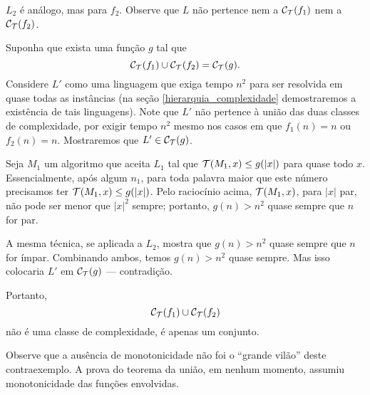 \begin{counterexample}
    $L_2$ é análogo, mas para $f_2$.
    Observe que $L$ não pertence nem a $\mathcal C_{\mathcal{T}}(f_1)$
    nem a $\mathcal C_{\mathcal{T}}(f_2)$.

    Suponha que exista uma função $g$ tal que
    \begin{equation*}
        \mathcal C_{\mathcal{T}}(f_1) \cup \mathcal C_{\mathcal{T}}(f_2) =
        \mathcal C_{\mathcal{T}}(g).
    \end{equation*}
    Considere $L'$ como uma linguagem que exiga tempo $n^2$
    para ser resolvida em quase todas as instâncias
    (na seção \ref{hierarquia_complexidade}
    demostraremos a existência de tais linguagens).
    Note que $L'$ não pertence à união das duas classes de complexidade,
    por exigir tempo $n^2$ mesmo nos casos em que
    $f_1(n) = n$ ou $f_2(n) = n$.
    Mostraremos que $L' \in \mathcal C_{\mathcal{T}}(g)$.

    Seja $M_1$ um algoritmo que aceita $L_1$
    tal que ${\mathcal{T}}(M_1, x) \leq g(|x|)$
    para quase todo $x$.
    Essencialmente,
    após algum $n_1$,
    para toda palavra maior que este número
    precisamos ter ${\mathcal{T}}(M_1, x) \leq g(|x|)$.
    Pelo raciocínio acima,
    ${\mathcal{T}}(M_1, x)$,
    para $|x|$ par,
    não pode ser menor que $|x|^2$ sempre;
    portanto, $g(n) > n^2$ quase sempre
    que $n$ for par.

    A mesma técnica,
    se aplicada a $L_2$,
    mostra que
    $g(n) > n^2$ quase sempre que $n$ for ímpar.
    Combinando ambos,
    temos $g(n) > n^2$ quase sempre.
    Mas isso colocaria $L'$ em $\mathcal C_{\mathcal{T}}(g)$
    --- contradição.

    Portanto,
    \begin{equation*}
        \mathcal C_{\mathcal{T}}(f_1) \cup \mathcal C_{\mathcal{T}}(f_2)
    \end{equation*}
    não é uma classe de complexidade,
    é apenas um conjunto.
\end{counterexample}

Observe que a ausência de monotonicidade
não foi o ``grande vilão''
deste contraexemplo.
A prova do teorema da união,
em nenhum momento,
assumiu monotonicidade das funções envolvidas.
